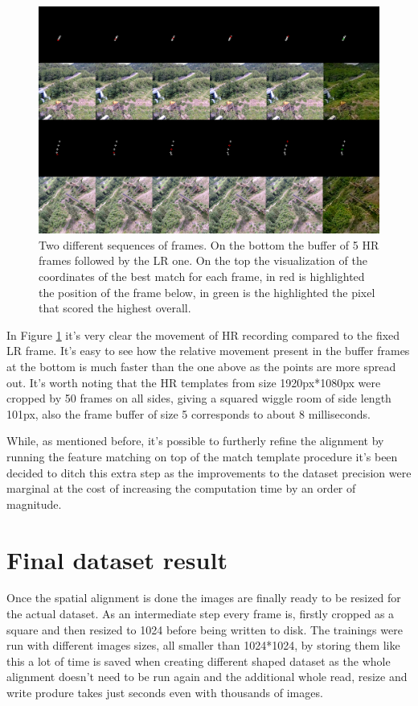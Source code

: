 \begin{figure}[H]
  \centering
  \includegraphics[scale=1.5]{figures/matchtemplate.png}
  \caption{Two different sequences of frames. On the bottom the buffer of 5 HR frames followed by the LR one. On the top the visualization of the coordinates of the best match for each frame, in red is highlighted the position of the frame below, in green is the highlighted the pixel that scored the highest overall.}
  \label{img:matchtempl}
\end{figure}

In Figure \ref{img:matchtempl} it's very clear the movement of HR recording compared to the fixed LR frame. It's easy to see how the relative movement present in the buffer frames at the bottom is much faster than the one above as the points are more spread out. It's worth noting that the HR templates from size 1920px*1080px were cropped by 50 frames on all sides, giving a squared wiggle room of side length 101px, also the frame buffer of size 5 corresponds to about 8 milliseconds.

While, as mentioned before, it's possible to furtherly refine the alignment by running the feature matching on top of the match template procedure it's been decided to ditch this extra step as the improvements to the dataset precision were marginal at the cost of increasing the computation time by an order of magnitude.

\section{Final dataset result}
\label{sec:final_dataset}

Once the spatial alignment is done the images are finally ready to be resized for the actual dataset. As an intermediate step every frame is, firstly cropped as a square and then resized to 1024 before being written to disk. The trainings were run with different images sizes, all smaller than 1024*1024, by storing them like this a lot of time is saved when creating different shaped dataset as the whole alignment doesn't need to be run again and the additional whole read, resize and write produre takes just seconds even with thousands of images.


